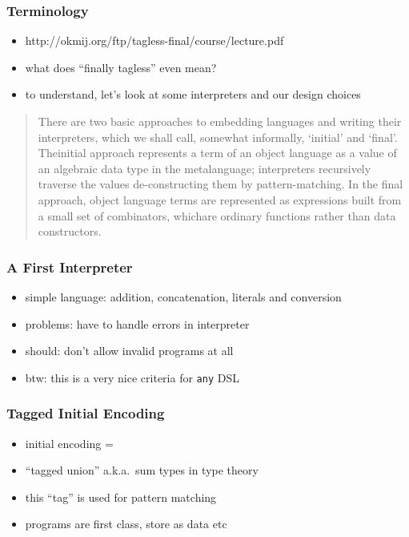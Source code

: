 \documentclass[aspectratio=169]{beamer}
\begin{document}
\begin{frame}
  \frametitle{Terminology}
  \begin{itemize}
  \item http://okmij.org/ftp/tagless-final/course/lecture.pdf
  \item what does ``finally tagless'' even mean?
  \item to understand, let's look at some interpreters and our design choices
  \end{itemize}

  \begin{quote}
    There are two basic approaches to embedding languages and writing
    their interpreters, which we shall call, somewhat informally,
    ‘initial’ and ‘final’. Theinitial approach represents a term of an
    object language as a value of an algebraic data type in the
    metalanguage; interpreters recursively traverse the values
    de-constructing them by pattern-matching. In the final approach,
    object language terms are represented as expressions built from a
    small set of combinators, whichare ordinary functions rather than
    data constructors.
  \end{quote}
\end{frame}

\begin{frame}
  \frametitle{A First Interpreter}
  \begin{itemize}
  \item simple language: addition, concatenation, literals and conversion
  \item problems: have to handle errors in interpreter
  \item should: don't allow invalid programs at all
  \item btw: this is a very nice criteria for \texttt{any} DSL
  \end{itemize}
\end{frame}

\begin{frame}
  \frametitle{Tagged Initial Encoding}
  \begin{itemize}
  \item initial encoding =
  \item ``tagged union'' a.k.a.\ sum types in type theory
  \item this ``tag'' is used for pattern matching
  \item programs are first class, store as data etc
  \end{itemize}
\end{frame}
\end{document}

